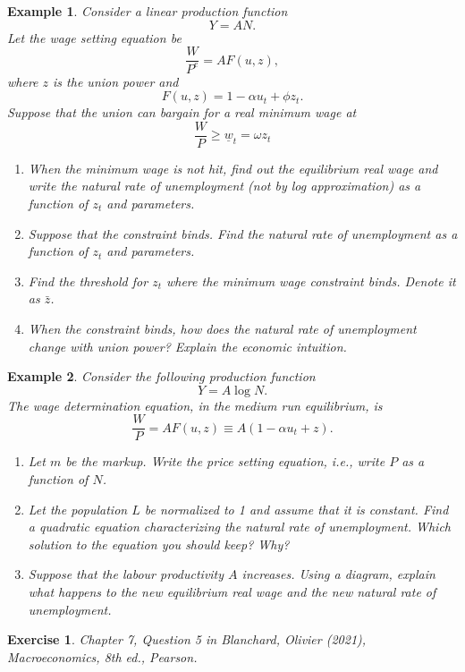 \documentclass[12pt]{article}
\newtheorem{example}{Example}
\newtheorem{exercise}{Exercise}
\begin{document}
\begin{example}
    Consider a linear production function
    \[Y = AN.\]
    Let the wage setting equation be
    \[\frac{W}{P^e} = A F(u,z),\]
    where $z$ is the union power and
    \[F(u,z) = 1 - \alpha u_t + \phi z_t.\]
    Suppose that the union can bargain for a real minimum wage at
    \[\frac{W}{P}\geq\underline{w}_t = \omega z_t\]
    \begin{enumerate}[label=(\arabic*)]
        \item When the minimum wage is not hit, find out the equilibrium real wage and write the natural rate of unemployment (not by log approximation) as a function of $z_t$ and parameters.
        \vspace{60pt}
        \item Suppose that the constraint binds. Find the natural rate of unemployment as a function of $z_t$ and parameters.
        \vspace{60pt}
        \item Find the threshold for $z_t$ where the minimum wage constraint binds. Denote it as $\bar{z}$.
        \vspace{60pt}
        \item When the constraint binds, how does the natural rate of unemployment change with union power? Explain the economic intuition.
        \vspace{60pt}
    \end{enumerate}
\end{example}


\begin{example}
    Consider the following production function
    \[Y = A \log N.\]
    The wage determination equation, in the medium run equilibrium, is
    \[\frac{W}{P} = AF(u,z)\equiv A(1-\alpha u_t + z).\]
    \begin{enumerate}[label=(\arabic*)]
        \item Let $m$ be the markup. Write the price setting equation, \textit{i.e.,} write $P$ as a function of $N$.
        \vspace{60pt}
        \item Let the population $L$ be normalized to 1 and assume that it is constant. Find a quadratic equation characterizing the natural rate of unemployment. Which solution to the equation you should keep? Why?
        \vspace{60pt}
        \item Suppose that the labour productivity $A$ increases. Using a diagram, explain what happens to the new equilibrium real wage and the new natural rate of unemployment.
        \vspace{60pt}
    \end{enumerate}
\end{example}
\begin{exercise}
    Chapter 7, Question 5 in Blanchard, Olivier (2021), \textit{Macroeconomics}, 8th ed., Pearson.
\end{exercise}
\end{document}
